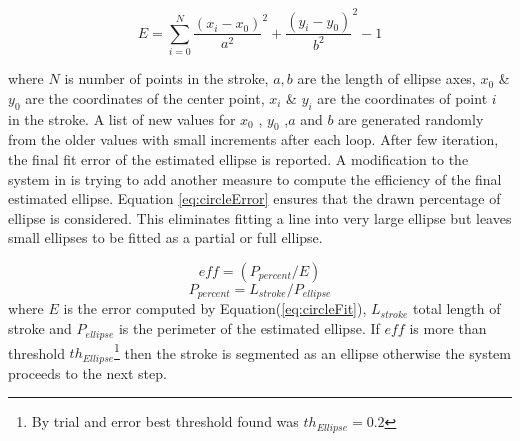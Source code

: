 \documentclass[12pt,1p,times]{elsarticle}%
\begin{document}
\begin{equation}
E = \sum\limits_{i = 0}^N {\frac{{(x_i - x_0 )}}{{a^2 }}^2  + \frac{{(y_i - y_0 )}}{{b^2 }}^2  - 1} 
\label{eq:circleFit}
\end{equation}

 where $N$ is number of points in the stroke, $a,b$ are the length of ellipse axes, $x_0$ \& $y_0$ are the coordinates of the center point, $x_i$ \& $y_i$ are the coordinates of point $i$ in the stroke. A list of new values for $x_0$ , $y_0$ ,$a$ and $b$ are generated randomly from the older values with small increments after each loop.  After few iteration, the final fit error of the estimated ellipse is reported. A modification to the system in \cite{mypaper} is trying to add another measure to compute the efficiency of the final estimated ellipse. Equation \ref{eq:circleError} ensures that the drawn percentage of ellipse is considered. This eliminates fitting a line into very large ellipse but leaves small ellipses to be fitted as a partial or full ellipse. 

 \begin{equation}
eff= (P_{percent}/E)
\label{eq:circleError}
\end{equation}
 \begin{equation}
P_{percent}  = L_{stroke} /P_{ellipse} 
\label{eq:ErrorArea}
\end{equation}
where $E$ is the error computed by Equation(\ref{eq:circleFit}), $L_{stroke}$ total length of stroke and $P_{ellipse} $ is the perimeter of the estimated ellipse. If $eff$ is more than threshold $th_{Ellipse}$\footnote{By trial and error best threshold found was $th_{Ellipse}=0.2$} then the stroke is segmented as an ellipse otherwise the system proceeds to the next step. 
\end{document}
